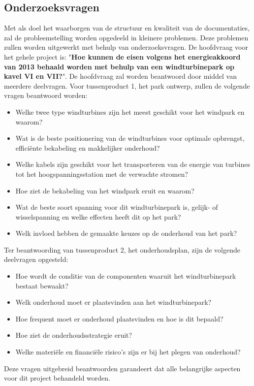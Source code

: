 \subsection{Onderzoeksvragen}
Met als doel het waarborgen van de structuur en kwaliteit van de documentaties, zal de probleemstelling worden opgedeeld in kleinere problemen. Deze problemen zullen worden uitgewerkt met behulp van onderzoeksvragen.\cite{projecthandleiding}
De hoofdvraag voor het gehele project is: "\textbf{Hoe kunnen de eisen volgens het energieakkoord \cite{energieakkoord} van 2013 behaald worden met behulp van een windturbinepark op kavel VI en VII?}". De hoofdvraag zal worden beantwoord door middel van meerdere deelvragen. Voor tussenproduct 1, het park ontwerp, zullen de volgende vragen beantwoord worden\cite{projecthandleiding}:
\begin{itemize}
    \item Welke twee type windturbines zijn het meest geschikt voor het windpark en waarom?
    \item Wat is de beste positionering van de windturbines voor optimale opbrengst, efficiënte bekabeling en makkelijker onderhoud?  
    \item Welke kabels zijn geschikt voor het transporteren van de energie van turbines tot het hoogspanningsstation met de verwachte stromen?
    \item Hoe ziet de bekabeling van het windpark eruit en waarom?
    \item Wat  de beste soort spanning voor dit windturbinepark is, gelijk- of wisselspanning en welke effecten heeft dit op het park? %
    \item Welk invloed hebben de gemaakte keuzes op de onderhoud van het park? 
\end{itemize}

Ter beantwoording van tussenproduct 2, het onderhoudsplan, zijn de volgende deelvragen opgesteld:
\begin{itemize}
    \item Hoe wordt de conditie van de componenten waaruit het windturbinepark bestaat bewaakt? 
    \item Welk onderhoud moet er plaatsvinden aan het windturbinepark?
    \item Hoe frequent moet er onderhoud plaatsvinden en hoe is dit bepaald?
    \item Hoe ziet de onderhoudsstrategie eruit? 
    \item Welke materiële en financiële risico's zijn er bij het plegen van onderhoud?
\end{itemize}

Deze vragen uitgebreid beantwoorden garandeert dat alle belangrijke aspecten voor dit project behandeld worden. 
